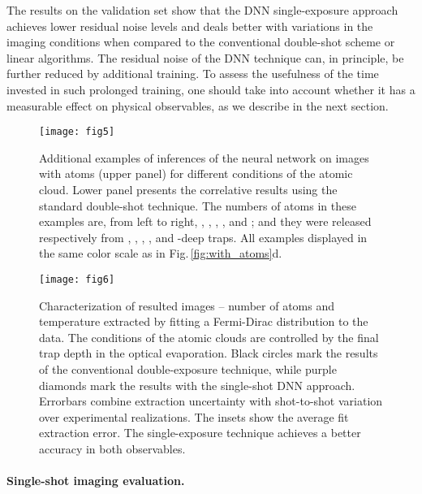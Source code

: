 \documentclass[twocolumn,groupedaddress,longbibliography]{revtex4-1}
\begin{document}
The results on the validation set show that the DNN single-exposure approach achieves lower residual noise levels and deals better with variations in the imaging conditions when compared to the conventional double-shot scheme or linear algorithms. The residual noise of the DNN technique can, in principle, be further reduced by additional training. To assess the usefulness of the time invested in such prolonged training, one should take into account whether it has a measurable effect on physical observables, as we describe in the next section.

\begin{figure*}
\centering
\texttt{[image: fig5]}
\caption{Additional examples of inferences of the neural network on images with atoms (upper panel) for different conditions of the atomic cloud. Lower panel presents the correlative results using the standard double-shot technique. The numbers of atoms in these examples are, from left to right, , , , , and ; and they were released respectively from , , , , and -deep traps. All examples displayed in the same color scale as in Fig.\,\ref{fig:with_atoms}d.
	}
	\label{fig:with_atoms_more_exps}
\end{figure*}

\begin{figure*}
\centering
\texttt{[image: fig6]}
\caption{Characterization of resulted images -- number of atoms and temperature extracted by fitting a Fermi-Dirac distribution to the data. The conditions of the atomic clouds are controlled by the final trap depth in the optical evaporation. Black circles mark the results of the conventional double-exposure technique, while purple diamonds mark the results with the single-shot DNN approach. Errorbars combine extraction uncertainty with shot-to-shot variation over  experimental realizations. The insets show the average fit extraction error. The single-exposure technique achieves a better accuracy in both observables.}
\label{fig:fitting_results}
\end{figure*}

\paragraph*{Single-shot imaging evaluation.}
\end{document}
